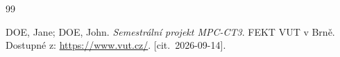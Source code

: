 \begin{thebibliography}{99}

    DOE, Jane; DOE, John.
    \textit{Semestrální projekt MPC-CT3}.
    FEKT VUT v Brně.
    Dostupné z: \url{https://www.vut.cz/}.
    [cit.~2026-09-14].

\end{thebibliography}